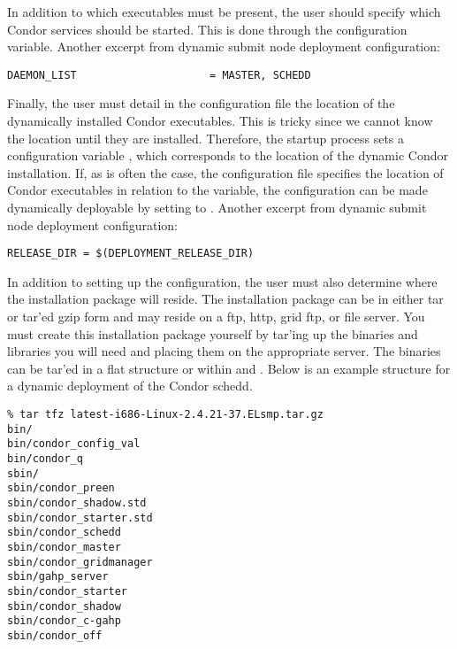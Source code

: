 In addition to which executables must be present, the user should
specify which Condor services should be started.  This is done through
the  configuration variable.  Another excerpt
from dynamic submit node deployment configuration:

\footnotesize
\begin{verbatim}
DAEMON_LIST                     = MASTER, SCHEDD
\end{verbatim}
\normalsize

Finally, the user must detail in the configuration file the location
of the dynamically installed Condor executables.  This is tricky since
we cannot know the location until they are installed.  Therefore, the
startup process sets a configuration variable
, which corresponds to the location of
the dynamic Condor installation.  If, as is often the case, the
configuration file specifies the location of Condor executables in
relation to the  variable, the configuration can
be made dynamically deployable by setting  to
.  Another excerpt from dynamic
submit node deployment configuration:

\footnotesize
\begin{verbatim}
RELEASE_DIR = $(DEPLOYMENT_RELEASE_DIR)
\end{verbatim}
\normalsize

In addition to setting up the configuration, the user must also
determine where the installation package will reside.  The
installation package can be in either tar or tar'ed gzip form and may
reside on a ftp, http, grid ftp, or file server.  You must create this
installation package yourself by tar'ing up the binaries and libraries
you will need and placing them on the appropriate server.  The
binaries can be tar'ed in a flat structure or within  and
.  Below is an example structure for a dynamic deployment
of the Condor schedd.

\footnotesize
\begin{verbatim}
% tar tfz latest-i686-Linux-2.4.21-37.ELsmp.tar.gz
bin/
bin/condor_config_val
bin/condor_q
sbin/
sbin/condor_preen
sbin/condor_shadow.std
sbin/condor_starter.std
sbin/condor_schedd
sbin/condor_master
sbin/condor_gridmanager
sbin/gahp_server
sbin/condor_starter
sbin/condor_shadow
sbin/condor_c-gahp
sbin/condor_off 
\end{verbatim}
\normalsize
